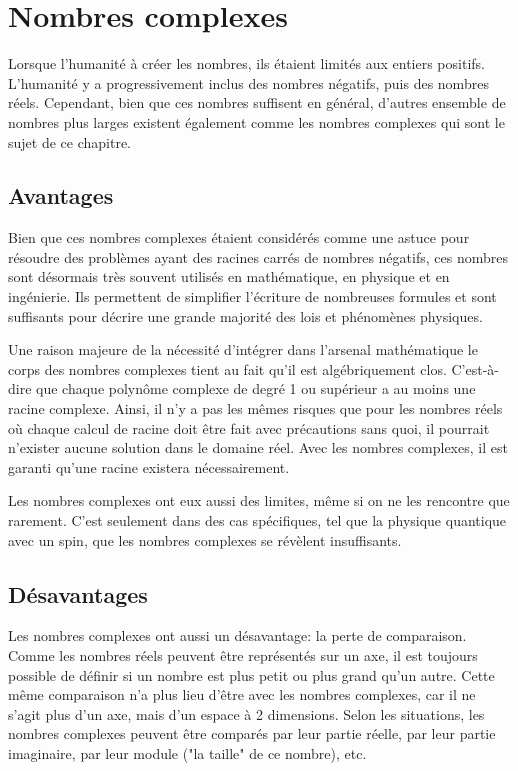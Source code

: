 \section{Nombres complexes}

Lorsque l'humanité à créer les nombres, ils étaient limités aux entiers positifs. L'humanité y a progressivement inclus des nombres négatifs, puis des nombres réels. Cependant, bien que ces nombres suffisent en général, d'autres ensemble de nombres plus larges existent également comme les nombres complexes qui sont le sujet de ce chapitre.

\subsection{Avantages}

Bien que ces nombres complexes étaient considérés comme une astuce pour résoudre des problèmes ayant des racines carrés de nombres négatifs, ces nombres sont désormais très souvent utilisés en mathématique, en physique et en ingénierie. Ils permettent de simplifier l'écriture de nombreuses formules et sont suffisants pour décrire une grande majorité des lois et phénomènes physiques.

Une raison majeure de la nécessité d'intégrer dans l'arsenal mathématique le corps des nombres complexes tient au fait qu'il est algébriquement clos. C'est-à-dire que chaque polynôme complexe de degré 1 ou supérieur a au moins une racine complexe. Ainsi, il n'y a pas les mêmes risques que pour les nombres réels où chaque calcul de racine doit être fait avec précautions sans quoi, il pourrait n'exister aucune solution dans le domaine réel. Avec les nombres complexes, il est garanti qu'une racine existera nécessairement.

Les nombres complexes ont eux aussi des limites, même si on ne les rencontre que rarement. C'est seulement dans des cas spécifiques, tel que la physique quantique avec un spin, que les nombres complexes se révèlent insuffisants.

\subsection{Désavantages}

Les nombres complexes ont aussi un désavantage: la perte de comparaison. Comme les nombres réels peuvent être représentés sur un axe, il est toujours possible de définir si un nombre est plus petit ou plus grand qu'un autre. Cette même comparaison n'a plus lieu d'être avec les nombres complexes, car il ne s'agit plus d'un axe, mais d'un espace à 2 dimensions. Selon les situations, les nombres complexes peuvent être comparés par leur partie réelle, par leur partie imaginaire, par leur module ("la taille" de ce nombre), etc.

